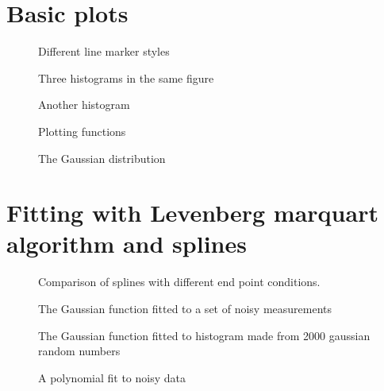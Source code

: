 \documentclass{article}
\begin{document}
\section{Basic plots}
\label{sec:basic}

\begin{figure}[H]
  \centering
  
  \caption{Different line marker styles}
\end{figure}

\begin{figure}[H]
  \centering
  
  \caption{Three histograms in the same figure}
\end{figure}

\begin{figure}[H]
  \centering
  
  \caption{Another histogram}
\end{figure}

\begin{figure}[H]
  \centering
  
  \caption{Plotting functions}
\end{figure}

\begin{figure}[H]
  \centering
  
  \caption{The Gaussian distribution}
\end{figure}

\section{Fitting with Levenberg marquart algorithm and splines}
\label{sec:LMA}

\begin{figure}[H]
  \centering
  
  \caption{Comparison of splines with different end point conditions.}
\end{figure}

\begin{figure}[H]
  \centering
  
  \caption{The Gaussian function fitted to a set of noisy measurements}
\end{figure}

\begin{figure}[H]
  \centering
  
  \caption{The Gaussian function fitted to histogram made from 2000 gaussian random numbers}
\end{figure}

\begin{figure}[H]
  \centering
  
  \caption{A polynomial fit to noisy data}
\end{figure}
\end{document}
